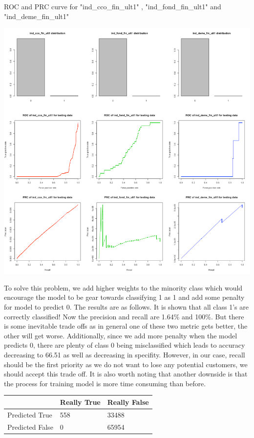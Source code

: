 \documentclass{article}
\begin{document}
\begin{spacing}{1}
\begin{large}
ROC and PRC curve for "ind\_cco\_fin\_ult1" , "ind\_fond\_fin\_ult1" and "ind\_deme\_fin\_ult1"

\vspace{5mm}
\includegraphics[scale = 0.8]{ROCandPR.png}
\vspace{5mm}

 To solve this problem, we add higher weights to the minority class which would encourage the model to be gear towards classifying 1 as 1 and add some penalty for model to predict 0. The results are as follows. It is shown that all class 1’s are correctly classified! Now the precision and recall are 1.64\% and 100\%. But there is some inevitable trade offs as in general one of these two metric gets better, the other will get worse. Additionally, since we add more penalty when the model predicts 0, there are plenty of class 0 being misclassified which leads to accuracy decreasing to 66.51 as well as decreasing in specifity. However, in our case, recall should be the first priority as we do not want to lose any potential customers, we should accept this trade off. It is also worth noting that another downside is that the process for training model is more time consuming than before.

\vspace{5mm}
\begin{tabular}{| l | l | l |}
	\hline
	& Really True & Really False \\ \hline
	Predicted True & 558 & 33488 \\ \hline
	Predicted False & 0 & 65954\\
	\hline
\end{tabular}
\vspace{5mm}


\end{large}
\end{spacing}
\end{document}
